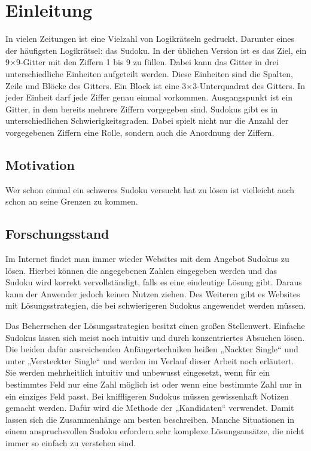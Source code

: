 
\chapter{Einleitung}

In vielen Zeitungen ist eine Vielzahl von Logikrätseln gedruckt. Darunter eines der häufigsten Logikrätsel: das Sudoku.
In der üblichen Version ist es das Ziel, ein 9×9-Gitter mit den Ziffern 1 bis 9 zu füllen. Dabei kann das Gitter in drei unterschiedliche Einheiten aufgeteilt werden. Diese Einheiten sind die Spalten, Zeile und Blöcke des Gitters. Ein Block ist eine 3×3-Unterquadrat des Gitters. In jeder Einheit darf jede Ziffer genau einmal vorkommen.
Ausgangspunkt ist ein Gitter, in dem bereits mehrere Ziffern vorgegeben sind. Sudokus gibt es in unterschiedlichen Schwierigkeitsgraden. Dabei spielt nicht nur die Anzahl der vorgegebenen Ziffern eine Rolle, sondern auch die Anordnung der Ziffern.

 

\section{Motivation}

Wer schon einmal ein schweres Sudoku versucht hat zu lösen ist vielleicht auch schon an seine Grenzen zu kommen. 



\section{Forschungsstand}


Im Internet findet man immer wieder Websites mit dem Angebot Sudokus zu lösen. Hierbei können die angegebenen Zahlen eingegeben werden und das Sudoku wird korrekt vervollständigt, falls es eine eindeutige Lösung gibt. Daraus kann der Anwender jedoch keinen Nutzen ziehen. Des Weiteren gibt es Websites mit Lösungsstrategien, die bei schwierigeren Sudokus angewendet werden müssen.

Das Beherrschen der Lösungsstrategien besitzt einen großen Stellenwert. Einfache Sudokus lassen sich meist noch intuitiv und durch konzentriertes Absuchen lösen. Die beiden dafür ausreichenden Anfängertechniken heißen „Nackter Single“ und unter „Versteckter Single“ und werden im Verlauf dieser Arbeit noch erläutert. Sie werden mehrheitlich intuitiv und unbewusst eingesetzt, wenn für ein bestimmtes Feld nur eine Zahl möglich ist oder wenn eine bestimmte Zahl nur in ein einziges Feld passt. Bei kniffligeren Sudokus müssen gewissenhaft Notizen gemacht werden. Dafür wird die Methode der „Kandidaten“ verwendet. Damit lassen sich die Zusammenhänge am besten beschreiben. Manche Situationen in einem anspruchsvollen Sudoku erfordern sehr komplexe Lösungsansätze, die nicht immer so einfach zu verstehen sind. 


